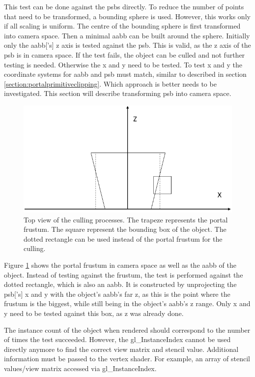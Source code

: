 This test can be done against the \glspl{psb} directly. To reduce the number of points that need to be transformed, a bounding sphere is used. However, this works only if all scaling is uniform. The centre of the bounding sphere is first transformed into camera space. Then a minimal \gls{aabb} can be built around the sphere. Initially only the \gls{aabb}['s] z axis is tested against the \gls{psb}. This is valid, as the z axis of the \gls{psb} is in camera space. If the test fails, the object can be culled and not further testing is needed. Otherwise the x and y need to be tested. To test x and y the coordinate systems for \gls{aabb} and \gls{psb} must match, similar to described in section \ref{section:portalprimitiveclipping}. Which approach is better needs to be investigated. This section will describe transforming \gls{psb} into camera space. 

\begin{figure}[h]
	\includegraphics[width=\linewidth]{images/frustumbox.png}
	\caption{Top view of the culling processes. The trapeze represents the portal frustum. The square represent the bounding box of the object. The dotted rectangle can be used instead of the portal frustum for the culling. }
	\label{fig:frustumbox}
\end{figure}

Figure \ref{fig:frustumbox} shows the portal frustum in camera space as well as the \gls{aabb} of the object. Instead of testing against the frustum, the test is performed against the dotted rectangle, which is also an \gls{aabb}. It is constructed by unprojecting the \gls{psb}['s] x and y with the object's \gls{aabb}'s far z, as this is the point where the frustum is the biggest, while still being in the object's \gls{aabb}'s z range. Only x and y need to be tested against this box, as z was already done.


The instance count of the object when rendered should correspond to the number of times the test succeeded. However, the gl\_InstanceIndex cannot be used directly anymore to find the correct view matrix and stencil value. Additional information must be passed to the vertex shader. For example, an array of stencil values/view matrix accessed via gl\_InstanceIndex.


